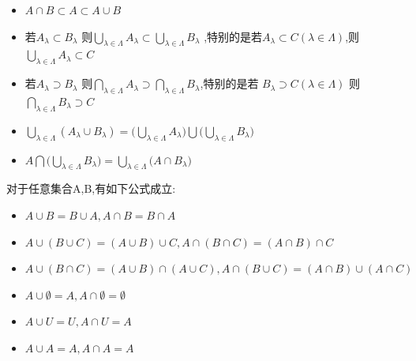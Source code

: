 \begin{Theorem}
    \begin{itemize}[itemsep=2pt,topsep=0pt,parsep=0pt]
        \item \(A \cap B \subset A \subset A \cup B \) \\
        \item 若\(A_{\lambda} \subset B_{\lambda}\) 则\(\bigcup\limits_{\lambda \in \Lambda} A_{\lambda} \subset \bigcup\limits_{\lambda \in \Lambda} B_{\lambda}\) ,特别的是若\(A_{\lambda} \subset  C (\lambda \in \Lambda)\),则 \(\bigcup\limits_{\lambda \in \Lambda} A_{\lambda} \subset C\)\\
        \item 若\(A_{\lambda} \supset B_{\lambda} \) 则\(\bigcap\limits_{\lambda \in \Lambda} A_{\lambda} \supset \bigcap\limits_{\lambda \in \Lambda} B_{\lambda}\),特别的是若 \(B_{\lambda} \supset C (\lambda \in \Lambda)\) 则 \(\bigcap\limits_{\lambda \in \Lambda} B_{\lambda}\supset C \)\\ 
        \item \(\bigcup\limits_{\lambda \in \Lambda}(A_{\lambda} \cup B_{\lambda})=\bigl(\bigcup\limits_{\lambda \in \Lambda} A_{\lambda}\bigr) \bigcup \bigl(\bigcup\limits_{\lambda \in \Lambda} B_{\lambda}\bigr)\) \\
        \item \(A \bigcap \bigl(\bigcup\limits_{\lambda \in \Lambda} B_{\lambda}\bigr) = \bigcup\limits_{\lambda \in \Lambda} \bigl(A \cap B_{\lambda}\bigr)\)
    \end{itemize}
\end{Theorem}
\begin{Theorem}
    对于任意集合A,B,有如下公式成立:
    \begin{itemize}[itemsep=2pt,topsep=0pt,parsep=0pt]
        \item \(A \cup B = B \cup A , A \cap B = B \cap A\) \\
        \item \(A \cup (B \cup C) = (A \cup B) \cup C , A \cap (B \cap C) = (A \cap B) \cap C\) \\
        \item \(A \cup (B \cap C) = (A \cup B) \cap (A \cup C) , A \cap (B \cup C) = (A \cap B) \cup (A \cap C)\) \\
        \item \(A \cup \emptyset = A , A \cap \emptyset = \emptyset\) \\
        \item \(A \cup U = U , A \cap U = A\) \\
        \item \(A \cup A =A , A \cap A = A \)\\
    \end{itemize}
\end{Theorem}
